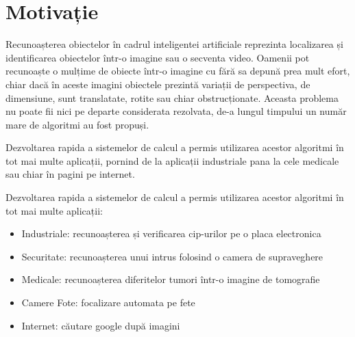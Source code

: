 \section{Motivație}

Recunoașterea obiectelor în cadrul inteligentei artificiale reprezinta localizarea și identificarea obiectelor într-o imagine sau o secventa video.
Oamenii pot recunoaște o mulțime de obiecte într-o imagine cu fără sa depună prea mult efort, chiar dacă în aceste imagini obiectele prezintă variații de perspectiva, de dimensiune, sunt translatate, rotite sau chiar obstrucționate.
Aceasta problema nu poate fii nici pe departe considerata rezolvata, de-a lungul timpului un număr mare de algoritmi au fost propuși.

Dezvoltarea rapida a sistemelor de calcul a permis utilizarea acestor algoritmi în tot mai multe aplicații, pornind de la aplicații industriale pana la cele medicale sau chiar în pagini pe internet.

Dezvoltarea rapida a sistemelor de calcul a permis utilizarea acestor algoritmi în tot mai multe aplicații:
\begin{itemize}
	\item Industriale: recunoașterea și verificarea cip-urilor pe o placa electronica
	\item Securitate: recunoașterea unui intrus folosind o camera de supraveghere
	\item Medicale: recunoașterea diferitelor tumori într-o imagine de tomografie
	\item Camere Fote: focalizare automata pe fete
	\item Internet: căutare google după imagini
\end{itemize}